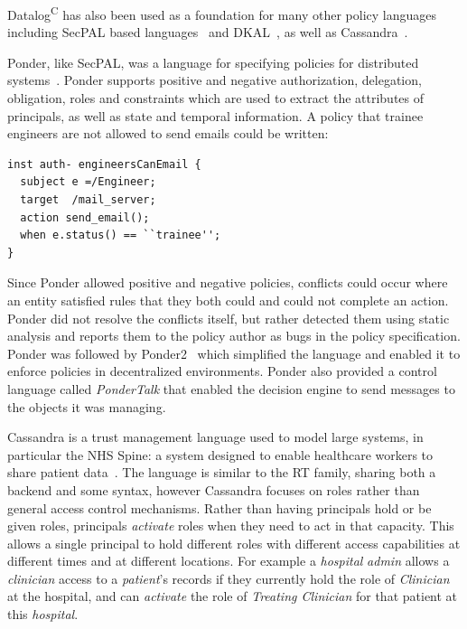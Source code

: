 \documentclass[thesis.tex]{subfiles}
\begin{document}
Datalog\textsuperscript{C} has also been used as a foundation for many
other policy languages including SecPAL based
languages~\cite{aziz_secpal4dsa:_2011,becker_secpal:_2006,becker_framework_2009}
and DKAL~\cite{gurevich_dkal:_2008}, as well as
Cassandra~\cite{becker_cassandra:_2004}.

Ponder, like SecPAL, was a language for specifying policies for distributed
systems~\cite{damianou_ponder_2001}. Ponder supports positive and negative
authorization, delegation, obligation, roles and constraints which are used to
extract the attributes of principals, as well as state and temporal information.
A policy that trainee engineers are not allowed to send emails could be written:

\begin{lstlisting}
inst auth- engineersCanEmail {
  subject e =/Engineer;
  target  /mail_server;
  action send_email();
  when e.status() == ``trainee'';
}
\end{lstlisting}

Since Ponder allowed positive and negative policies, conflicts could occur where
an entity satisfied rules that they both could and could not complete an action.
Ponder did not resolve the conflicts itself, but rather detected them using
static analysis and reports them to the policy author as bugs in the policy
specification. Ponder was followed by Ponder2~\cite{twidle_ponder2:_2009} which
simplified the language and enabled it to enforce policies in decentralized
environments. Ponder also provided a control language called \emph{PonderTalk}
that enabled the decision engine to send messages to the objects it was
managing.

Cassandra is a trust management language used to model large systems,
in particular the NHS Spine: a system designed to enable healthcare
workers to share patient
data~\cite{becker_cassandra:_2004,becker_cassandra:_2004-1}.  The
language is similar to the RT family, sharing both a backend and some
syntax, however Cassandra focuses on roles rather than general access
control mechanisms.  Rather than having principals hold or be given
roles, principals \emph{activate} roles when they need to act in that
capacity.  This allows a single principal to hold different roles with
different access capabilities at different times and at different
locations.  For example a \emph{hospital} \emph{admin} allows a
\emph{clinician} access to a \emph{patient}'s records if they
currently hold the role of \emph{Clinician} at the hospital, and can
\emph{activate} the role of \emph{Treating Clinician} for that patient
at this \emph{hospital}.
\end{document}
